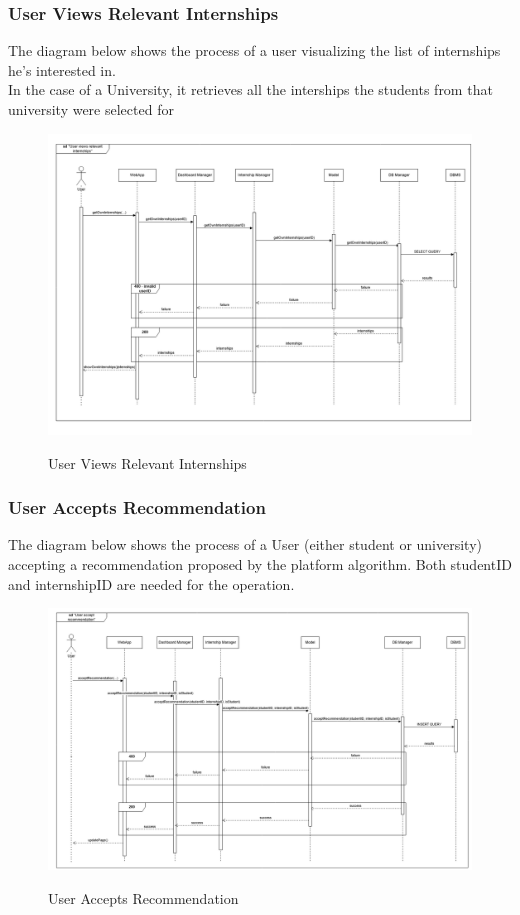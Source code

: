 \documentclass[a4paper,12pt]{article}
\begin{document}
\subsubsection*{User Views Relevant Internships}
The diagram below shows the process of a user visualizing the list of internships he's interested in. \\
In the case of a University, it retrieves all the interships the students from that university were selected for
\begin{figure}[H]
\centering
\includegraphics[scale = 0.4]{DD_figures/RuntimeView/UserViewsRelevantInternshipsRV.png}\\
\caption{User Views Relevant Internships}
\end{figure}
\newpage

\subsubsection*{User Accepts Recommendation}
The diagram below shows the process of a User (either student or university) accepting a recommendation proposed by the platform algorithm. Both studentID and internshipID are needed for the operation.
\begin{figure}[H]
\centering
\includegraphics[scale = 0.4]{DD_figures/RuntimeView/UserAcceptsRecommendationRV.png}\\
\caption{User Accepts Recommendation}
\end{figure}
\newpage
\end{document}
